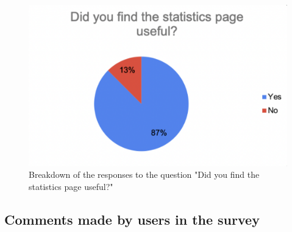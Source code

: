 \documentclass{l4proj}
\begin{document}
\begin{appendices}
\begin{figure}[H]
    \begin{centering}
    \includegraphics[scale=0.5]{images/userSurvey4.pdf}
    \caption{Breakdown of the responses to the question "Did you find the statistics page useful?"}
    \label{fig: userSurvey4}
    \end{centering}
\end{figure}

\subsection{Comments made by users in the survey}







\end{appendices}






\end{document}
